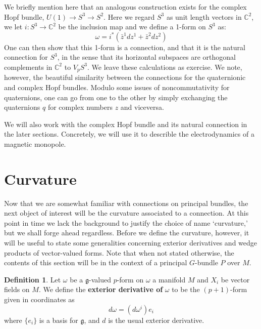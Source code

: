 \documentclass{book}
\newcommand{\C}{\mathbb{C}}
\newcommand{\fr}{\mathfrak}
\theoremstyle{plain}
\theoremstyle{definition}
\newtheorem{defn}{Definition}
\theoremstyle{remark}
\begin{document}
We briefly mention here that an analogous construction exists for the complex Hopf bundle, $U(1) \to S^3 \to S^2$. Here we regard $S^3$ as unit length vectors in $\C^2$, we let $i:S^3 \to \C^2$ be the inclusion map and we define a 1-form on $S^3$ as:
\[       \omega = i^* (\bar z^1 dz^1 + \bar z^2 dz^2)       \]
One can then show that this 1-form is a connection, and that it is the natural connection for $S^3$, in the sense that its horizontal subspaces are orthogonal complements in $\C^2$ to $V_p S^3$. We leave these calculations as exercise. We note, however, the beautiful similarity between the connections for the quaternionic and complex Hopf bundles. Modulo some issues of noncommutativity for quaternions, one can go from one to the other by simply exchanging the quaternions $q$ for complex numbers $z$ and viceversa.

We will also work with the complex Hopf bundle and its natural connection in the later sections. Concretely, we will use it to describle the electrodynamics of a magnetic monopole.


















\section{Curvature}

Now that we are somewhat familiar with connections on principal bundles, the next object
of interest will be the curvature associated to a connection. At this point in time we lack
the background to justify the choice of name `curvature,' but we shall forge ahead regardless. 
Before we define the curvature, however, it will be useful to state some generalities concerning
exterior derivatives and wedge products of vector-valued forms. Note that when not stated otherwise,
the contents of this section will be in the context of a principal $G$-bundle $P$ over $M$.

\begin{defn}
    Let $\omega$ be a $\fr g$-valued $p$-form on $\omega$ a manifold $M$ and $X_i$ be vector fields on $M$.
    We define the \textbf{exterior derivative of} $\omega$ to be the $(p+1)$-form given in coordinates as
    \[d\omega = (d\omega^i)e_i\]
    where $\{e_i\}$ is a basis for $\fr g$, and $d$ is the usual exterior derivative.
\end{defn}
\end{document}
